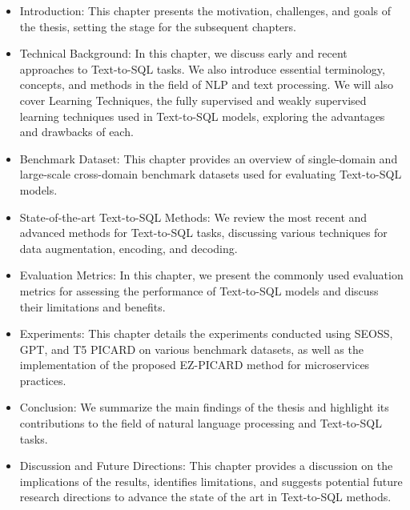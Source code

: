 \begin{itemize}
    \item Introduction: This chapter presents the motivation, challenges, and goals of the thesis, setting the stage for the subsequent chapters.
    \item Technical Background: In this chapter, we discuss early and recent approaches to Text-to-SQL tasks. We also introduce essential terminology, concepts, and methods in the field of NLP and text processing. We will also cover Learning Techniques, the fully supervised and weakly supervised learning techniques used in Text-to-SQL models, exploring the advantages and drawbacks of each.
    \item Benchmark Dataset: This chapter provides an overview of single-domain and large-scale cross-domain benchmark datasets used for evaluating Text-to-SQL models.
    \item State-of-the-art Text-to-SQL Methods: We review the most recent and advanced methods for Text-to-SQL tasks, discussing various techniques for data augmentation, encoding, and decoding.
    \item Evaluation Metrics: In this chapter, we present the commonly used evaluation metrics for assessing the performance of Text-to-SQL models and discuss their limitations and benefits.
    \item Experiments: This chapter details the experiments conducted using SEOSS, GPT, and T5 PICARD on various benchmark datasets, as well as the implementation of the proposed EZ-PICARD method for microservices practices.
    \item Conclusion: We summarize the main findings of the thesis and highlight its contributions to the field of natural language processing and Text-to-SQL tasks.
    \item Discussion and Future Directions: This chapter provides a discussion on the implications of the results, identifies limitations, and suggests potential future research directions to advance the state of the art in Text-to-SQL methods.
\end{itemize}
